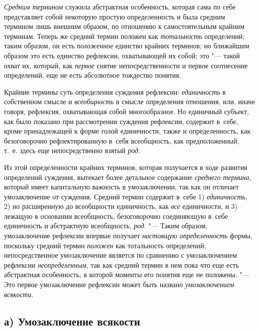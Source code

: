 {\em Средним термином}
служила абстрактная особенность, которая сама по себе
представляет собой некоторую простую определенность и была средним термином
лишь внешним образом, по отношению к самостоятельным крайним терминам.
Теперь же средний термин положен как
{\em тотальность}
определений; таким образом, он есть
{\em положенное} единство
крайних терминов; но ближайшим образом это есть единство рефлексии,
охватывающей их собой; это "--- такой охват их, который, как
{\em первое} снятие
непосредственности и первое соотнесение определений, еще не есть абсолютное
тождество понятия.

Крайние термины суть определения суждения рефлексии:
{\em единичность} в
собственном смысле и {\em всеобщность}
в смысле определения отношения, или, иначе говоря, рефлексия,
охватывающая собой многообразное. Но единичный субъект, как было показано
при рассмотрении суждения рефлексии, содержит в~себе, кроме принадлежащей к
форме голой единичности, также и определенность, как безоговорочно
рефлектированную в~себя всеобщность, как предположенный, т.~е. здесь еще
непосредственно взятый {\em род}.

Из этой определенности крайних терминов, которая получается в
ходе развития определений суждения, вытекает более детальное содержание
{\em среднего термина},
который имеет капитальную важность в умозаключении, так как
он отличает умозаключение от суждения. Средний термин содержит в~себе 1)
{\em единичность}, 2) но
расширенную до всеобщности единичность, как
{\em все} единичности, и
3) лежащую в основании всеобщность, безоговорочно соединяющую в~себе
единичность и абстрактную всеобщность,
{\em род}. "--- Таким
образом, умозаключение рефлексии впервые получает
{\em настоящую определенность}
формы, поскольку средний термин
{\em положен} как
тотальность определений; непосредственное умозаключение является
по сравнению с умозаключением рефлексии
{\em неопределенным}, так
как средний термин в нем пока что еще есть абстрактная особенность, в
которой моменты его понятия еще не положены. "--- Это первое
умозаключение рефлексии может быть названо
{\em умозаключением
всякости}.

\subsection[а) Умозаключение всякости]{а) Умозаключение всякости}

